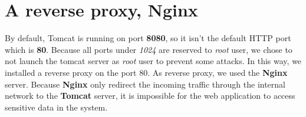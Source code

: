 \section{A reverse proxy, Nginx}

By default, Tomcat is running on port \textbf{8080}, so it isn't the default HTTP port which is \textbf{80}. Because all ports under \textit{1024} are reserved to \textit{root} user, we chose to not launch the tomcat server as \textit{root} user to prevent some attacks. In this way, we installed a reverse proxy on the port 80. As reverse proxy, we used the \textbf{Nginx} server.
Because \textbf{Nginx} only redirect the incoming traffic through the internal network to the \textbf{Tomcat} server, it is impossible for the web application to access sensitive data in the system.